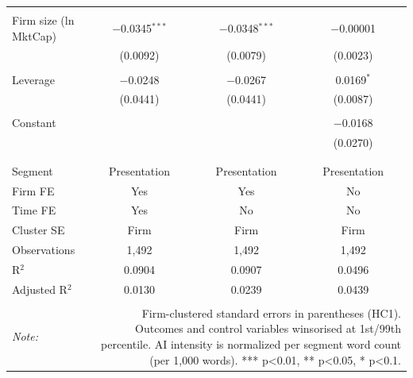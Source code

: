 \begin{table}[!htbp]
\begin{tabular}{@{\extracolsep{5pt}}lccc}
  & & & \\ 
 Firm size (ln MktCap) & $-$0.0345$^{***}$ & $-$0.0348$^{***}$ & $-$0.00001 \\ 
  & (0.0092) & (0.0079) & (0.0023) \\ 
  & & & \\ 
 Leverage & $-$0.0248 & $-$0.0267 & 0.0169$^{*}$ \\ 
  & (0.0441) & (0.0441) & (0.0087) \\ 
  & & & \\ 
 Constant &  &  & $-$0.0168 \\ 
  &  &  & (0.0270) \\ 
  & & & \\ 
\hline \\[-1.8ex] 
Segment & Presentation & Presentation & Presentation \\ 
Firm FE & Yes & Yes & No \\ 
Time FE & Yes & No & No \\ 
Cluster SE & Firm & Firm & Firm \\ 
Observations & 1,492 & 1,492 & 1,492 \\ 
R$^{2}$ & 0.0904 & 0.0907 & 0.0496 \\ 
Adjusted R$^{2}$ & 0.0130 & 0.0239 & 0.0439 \\ 
\hline 
\hline \\[-1.8ex] 
\textit{Note:}  & \multicolumn{3}{r}{Firm-clustered standard errors in parentheses (HC1). Outcomes and control variables winsorised at 1st/99th percentile. AI intensity is normalized per segment word count (per 1,000 words). *** p<0.01, ** p<0.05, * p<0.1.} \\ 
\end{tabular} 
\end{table} 

